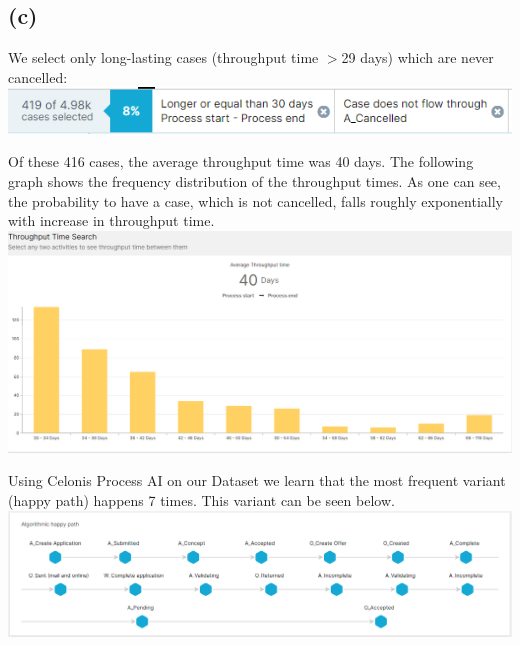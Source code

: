 \documentclass[../../main.tex]{subfiles}
\begin{document}
\subsection*{(c)}
We select only long-lasting cases (throughput time $>$29 days) which are never cancelled:
\includegraphics[width=\textwidth]{img/QUESTION_5c_selection.png}

Of these 416 cases, the average throughput time was 40 days. The following graph shows the frequency distribution of the throughput times. As one can see, the probability to have a case, which is not cancelled, falls roughly exponentially with increase in throughput time.\\
\includegraphics[width=\textwidth]{img/QUESTION_5c_throughput_time.png}

Using Celonis Process AI on our Dataset we learn that the most frequent variant (happy path) happens 7 times. This variant can be seen below.\\
\includegraphics[width=\textwidth]{img/QUESTION_5c_happy_path.png}
\end{document}
